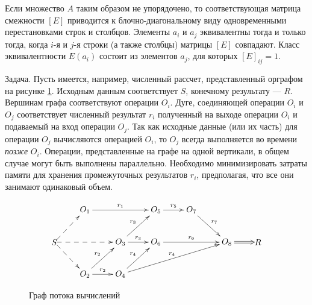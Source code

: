Если множество $A$ таким образом не упорядочено, то соответствующая матрица смежности $[E]$ приводится к блочно-диагональному виду одновременными перестановками строк и столбцов. Элементы $a_i$ и $a_j$ эквивалентны тогда и только тогда, когда $i$-я и $j$-я строки (а также столбцы) матрицы $[E]$ совпадают. Класс эквивалентности $E(a_i)$ состоит из элементов $a_j$, для которых $[E]_{ij}=1$.

\begin{exampl}
    Задача. Пусть имеется, например, численный рассчет, представленный орграфом на рисунке \ref{fig:bo:calcFlowEx}. Исходным данным соответствует $S$, конечному результату --- $R$. Вершинам графа соответствуют операции $O_i$. Дуге, соединяющей операции $O_i$ и $O_j$ соответствует численный результат $r_i$ полученный на выходе операции $O_i$ и подаваемый на вход операции $O_j$. Так как исходные данные (или их часть) для операции $O_j$ вычисляются операцией $O_i$, то $O_j$ всегда выполняется во времени \emph{позже} $O_i$. Операции, представленные на графе на одной вертикали, в общем случае могут быть выполнены параллельно. Необходимо минимизировать затраты памяти для хранения промежуточных результатов $r_i$, предполагая, что все они занимают одинаковый объем.
\end{exampl}

\begin{figure}
    \centering
    \[
    {\xymatrix{
        *{}
            &O_1\ar@{->}[rr]^{r_1}
                &*{}
                    &O_5 \ar@{->}[r]^{r_5}
                        &O_7 \ar@{->}[dr]^{r_7}
                            &*{}
                                &*{}
                \\
        *{S} \ar@{-->}[ur] \ar@{-->}[dr] \ar@{-->}[rr]
            &*{}
                &O_3 \ar@{->}[r]^{r_3} \ar@{->}[ur]^{r_3}
                    &O_6 \ar@{->}[rr]^{r_6}
                        &*{}
                            &O_8 \ar@{=>}[r]
                                &*{R}
                \\
        *{}
            &O_2 \ar@{->}[r]^{r_2} \ar@{->}[ur]^{r_2}
                &O_4 \ar@{->}[ur]^{r_4} \ar@{->}[urrr]^{r_4}
                    &*{}
                        &*{}
                            &*{}
                                &*{}
                \\
    }}
    \]
    \caption{Граф потока вычислений}
    \label{fig:bo:calcFlowEx}
\end{figure}

